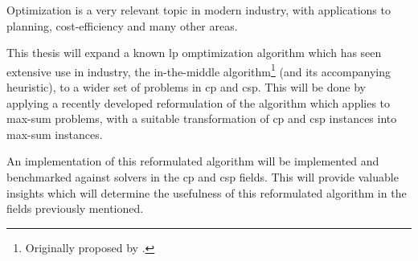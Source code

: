 Optimization is a very relevant topic in modern industry, with applications to planning, cost-efficiency and many other areas.

This thesis will expand a known \acrlong{lp} omptimization algorithm which has seen extensive use in industry, the in-the-middle algorithm\footnote{Originally proposed by \textcite{Wedelin95}.} (and its accompanying heuristic), to a wider set of problems in \acrlong{cp} and \acrlong{csp}.
This will be done by applying a recently developed reformulation of the algorithm which applies to max-sum problems, with a suitable transformation of \acrlong{cp} and \acrlong{csp} instances into max-sum instances.

An implementation of this reformulated algorithm will be implemented and benchmarked against solvers in the \acrlong{cp} and \acrlong{csp} fields.
This will provide valuable insights which will determine the usefulness of this reformulated algorithm in the fields previously mentioned.


